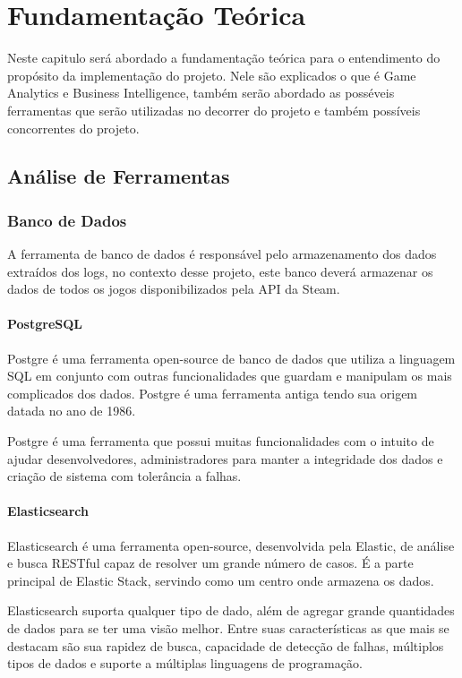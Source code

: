\chapter[Fundamentação Teórica]{Fundamentação Teórica}
Neste capitulo será abordado a fundamentação teórica para o entendimento do propósito da implementação do projeto. Nele são explicados o que é Game Analytics e Business Intelligence, também serão abordado as posséveis ferramentas que serão utilizadas no decorrer do projeto e também possíveis concorrentes do projeto.
\section{Análise de Ferramentas}
\subsection{Banco de Dados}
A ferramenta de banco de dados é responsável pelo armazenamento dos dados extraídos dos logs, no contexto desse projeto, este banco deverá armazenar os dados de todos os jogos disponibilizados pela API da Steam.
\subsubsection*{PostgreSQL}
Postgre é uma ferramenta open-source de banco de dados que utiliza a linguagem SQL em conjunto com outras funcionalidades que guardam e manipulam os mais complicados dos dados. Postgre é uma ferramenta antiga tendo sua origem datada no ano de 1986\cite{postgresql}.

Postgre é uma ferramenta que possui muitas funcionalidades com o intuito de ajudar desenvolvedores, administradores para manter a integridade dos dados e criação de sistema com tolerância a falhas.
\subsubsection*{Elasticsearch}
Elasticsearch é uma ferramenta open-source, desenvolvida pela Elastic, de análise e busca RESTful capaz de resolver um grande número de casos. É a parte principal de Elastic Stack, servindo como um centro onde armazena os dados\cite{elasticsearch}.

Elasticsearch suporta qualquer tipo de dado, além de agregar grande quantidades de dados para se ter uma visão melhor. Entre suas características as que mais se destacam são sua rapidez de busca, capacidade de detecção de falhas, múltiplos tipos de dados e suporte a múltiplas linguagens de programação.
